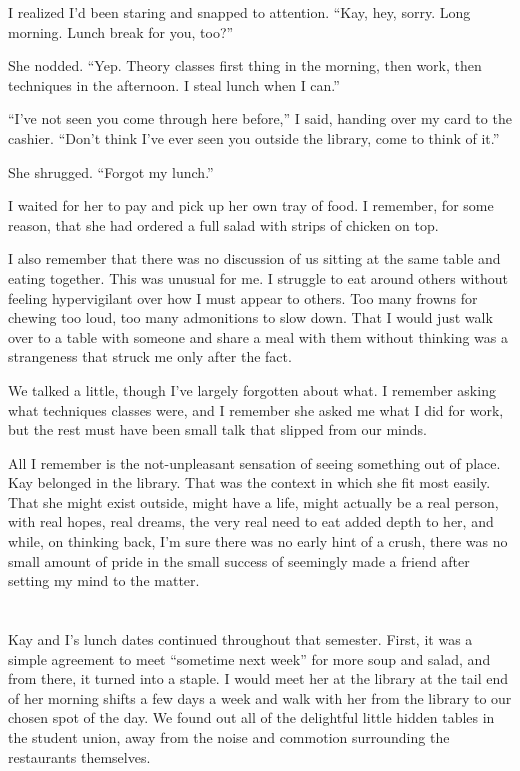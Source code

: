 I realized I'd been staring and snapped to attention. ``Kay, hey, sorry. Long morning. Lunch break for you, too?''

She nodded. ``Yep. Theory classes first thing in the morning, then work, then techniques in the afternoon. I steal lunch when I can.''

``I've not seen you come through here before,'' I said, handing over my card to the cashier. ``Don't think I've ever seen you outside the library, come to think of it.''

She shrugged. ``Forgot my lunch.''

I waited for her to pay and pick up her own tray of food. I remember, for some reason, that she had ordered a full salad with strips of chicken on top.

I also remember that there was no discussion of us sitting at the same table and eating together. This was unusual for me. I struggle to eat around others without feeling hypervigilant over how I must appear to others. Too many frowns for chewing too loud, too many admonitions to slow down. That I would just walk over to a table with someone and share a meal with them without thinking was a strangeness that struck me only after the fact.

We talked a little, though I've largely forgotten about what. I remember asking what techniques classes were, and I remember she asked me what I did for work, but the rest must have been small talk that slipped from our minds.

All I remember is the not-unpleasant sensation of seeing something out of place. Kay belonged in the library. That was the context in which she fit most easily. That she might exist outside, might have a life, might actually be a real person, with real hopes, real dreams, the very real need to eat added depth to her, and while, on thinking back, I'm sure there was no early hint of a crush, there was no small amount of pride in the small success of seemingly made a friend after setting my mind to the matter.

\section{}

Kay and I's lunch dates continued throughout that semester. First, it was a simple agreement to meet ``sometime next week'' for more soup and salad, and from there, it turned into a staple. I would meet her at the library at the tail end of her morning shifts a few days a week and walk with her from the library to our chosen spot of the day. We found out all of the delightful little hidden tables in the student union, away from the noise and commotion surrounding the restaurants themselves.

